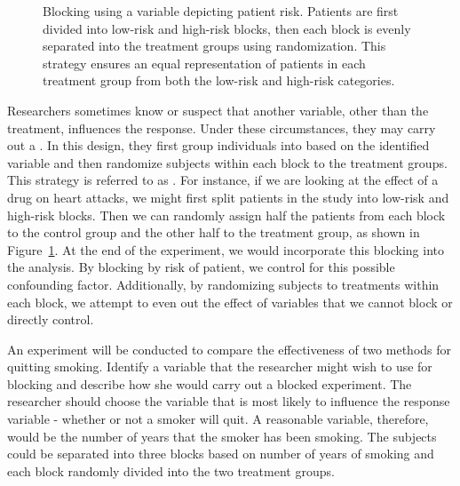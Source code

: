 \begin{figure}
\centering
{}
\caption{Blocking using a variable depicting patient risk. Patients are first divided into low-risk and high-risk blocks, then each block is evenly separated into the treatment groups using randomization. This strategy ensures an equal representation of patients in each treatment group from both the low-risk and high-risk categories.}
\label{figureShowingBlocking}
\end{figure}

Researchers sometimes know or suspect that another variable, other than the treatment, influences the response. Under these circumstances, they may carry out a . In this design, they first group individuals into  based on the identified variable and then randomize subjects within each block to the treatment groups. This strategy is referred to as . For instance, if we are looking at the effect of a drug on heart attacks, we might first split patients in the study into low-risk and high-risk blocks. Then we can randomly assign half the patients from each block to the control group and the other half to the treatment group, as shown in Figure~\ref{figureShowingBlocking}. At the end of the experiment, we would incorporate this blocking into the analysis. By blocking by risk of patient, we control for this possible confounding factor. Additionally, by randomizing subjects to treatments within each block, we attempt to even out the effect of variables that we cannot block or directly control.

\begin{examplewrap}
\begin{nexample}{An experiment will be conducted to compare the effectiveness of two methods for quitting smoking. Identify a variable that the researcher might wish to use for blocking and describe how she would carry out a blocked experiment.}
The researcher should choose the variable that is most likely to influence the response variable - whether or not a smoker will quit. A reasonable variable, therefore, would be the number of years that the smoker has been smoking. The subjects could be separated into three blocks based on number of years of smoking and each block randomly divided into the two treatment groups.
\end{nexample}
\end{examplewrap}

